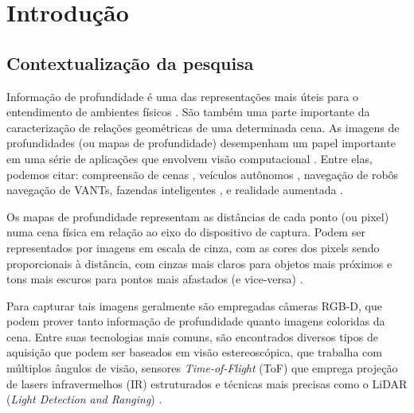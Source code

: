 
\chapter{Introdução}

\section{Contextualização da pesquisa}

Informação de profundidade é uma das representações mais úteis para o entendimento de ambientes físicos \cite{lasinger2019towards} \cite{zhou2019does}. São também uma parte importante da caracterização de relações geométricas de uma determinada cena. As imagens de profundidades (ou mapas de profundidade) desempenham um papel importante em uma série de aplicações que envolvem visão computacional \cite{eigen2014depth}.  Entre elas, podemos citar: compreensão de cenas \cite{jaritz2018sparse}, veículos autônomos \cite{song2021self}, navegação de robôs \cite{ma2019sparse} navegação de VANTs, \cite{padhy2023monocular} fazendas inteligentes \cite{farkhani2019sparse}, e realidade aumentada \cite{du2020depthlab}. 


Os mapas de profundidade representam as distâncias de cada ponto (ou pixel) numa cena física em relação ao eixo do dispositivo de captura. Podem ser representados por imagens em escala de cinza, com as cores dos pixels sendo proporcionais à distância, com cinzas mais claros para objetos mais próximos e tons mais escuros para pontos mais afastados (e vice-versa) \cite{dourado2020multi}.



Para capturar tais imagens geralmente são empregadas câmeras RGB-D, que podem prover tanto informação de profundidade quanto imagens coloridas da cena. Entre suas tecnologias mais comuns, são encontrados diversos tipos de aquisição que podem ser baseados em visão estereoscópica, que trabalha com múltiplos ângulos de visão, sensores \textit{Time-of-Flight} (ToF) que emprega projeção de lasers infravermelhos (IR) estruturados e técnicas mais precisas como o LiDAR (\textit{Light Detection and Ranging}) \cite{castellano2023performance}.


